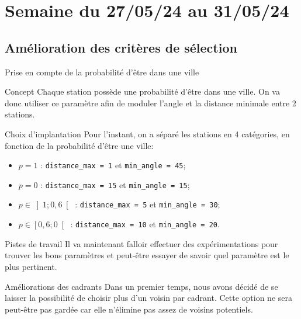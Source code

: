 \smallframetitle

\section{Semaine du 27/05/24 au 31/05/24}
\insertsectionframe

\subsection{Amélioration des critères de sélection}
\insertsubsectionframe

\begin{frame}{Prise en compte de la probabilité d'être dans une ville}
    \begin{block}{Concept}
        Chaque station possède une probabilité d'être dans une ville.
        On va donc utiliser ce paramètre afin de moduler l'angle et la distance minimale entre 2 stations.
    \end{block}

    \begin{block}{Choix d'implantation}
        Pour l'instant, on a séparé les stations en 4 catégories, en fonction de la probabilité d'être une ville:
        \begin{itemize}
            \item $p=1$ : \texttt{distance\_max = 1} et \texttt{min\_angle = 45};
            \item $p=0$ : \texttt{distance\_max = 15} et \texttt{min\_angle = 15};
            \item $p\in\left]1 ; 0,6\right[$ : \texttt{distance\_max = 5} et \texttt{min\_angle = 30};
            \item $p\in\left[0,6 ; 0\right[$ : \texttt{distance\_max = 10} et \texttt{min\_angle = 20}.
        \end{itemize}
    \end{block}
    
    \begin{alertblock}{Pistes de travail}
        Il va maintenant falloir effectuer des expérimentations pour trouver les bons paramètres et peut-être essayer de savoir quel paramètre est le plus pertinent.
    \end{alertblock}
\end{frame}

\begin{frame}{Améliorations des cadrants}
    Dans un premier temps, nous avons décidé de se laisser la possibilité de choisir plus d'un voisin par cadrant.
    Cette option ne sera peut-être pas gardée car elle n'élimine pas assez de voisins potentiels.
\end{frame}
